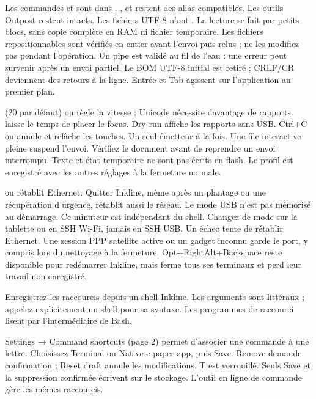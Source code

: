Les commandes  et  sont dans
. ,  et
 restent des alias compatibles. Les outils Outpost restent intacts.
\UsbExamples
Les fichiers UTF-8 n'ont . La lecture se fait
par petits blocs, sans copie complète en RAM ni fichier temporaire. Les fichiers
repositionnables sont vérifiés en entier avant l'envoi puis relus ; ne les modifiez
pas pendant l'opération. Un pipe est validé au fil de l'eau : une erreur peut
survenir après un envoi partiel. Le BOM UTF-8 initial est retiré ; CRLF/CR deviennent
des retours à la ligne. Entrée et Tab agissent sur l'application au premier plan.

 (20 par défaut) ou  règle la vitesse ; Unicode
nécessite davantage de rapports.  laisse le temps de placer
le focus. Dry-run affiche les rapports sans USB. Ctrl+C ou  annule
et relâche les touches. Un seul émetteur à la fois. Une file interactive pleine
suspend l'envoi. Vérifiez le document avant de reprendre un envoi interrompu.
Texte et état temporaire ne sont pas écrits en flash. Le profil est enregistré
avec les autres réglages à la fermeture normale.

 ou  rétablit Ethernet. Quitter Inkline,
même après un plantage ou une récupération d'urgence, rétablit aussi le réseau.
Le mode USB n'est pas mémorisé au démarrage.
\UsbRecoveryExample
Ce minuteur est indépendant du shell. Changez de mode sur la tablette ou en SSH
Wi-Fi, jamais en SSH USB. Un échec tente de rétablir Ethernet. Une session PPP
satellite active ou un gadget inconnu garde le port, y compris lors du nettoyage
à la fermeture. Opt+RightAlt+Backspace reste disponible pour redémarrer Inkline,
mais ferme tous ses terminaux et perd leur travail non enregistré.

Enregistrez les raccourcis depuis un shell Inkline. Les arguments sont littéraux ;
appelez explicitement un shell pour sa syntaxe. Les programmes de raccourci
lisent  par l'intermédiaire de Bash.

Settings → Command shortcuts (page 2) permet d’associer une commande à une lettre. Choisissez Terminal ou Native e-paper app, puis Save. Remove demande confirmation ; Reset draft annule les modifications. T est verrouillé. Seuls Save et la suppression confirmée écrivent sur le stockage. L’outil en ligne de commande gère les mêmes raccourcis.

